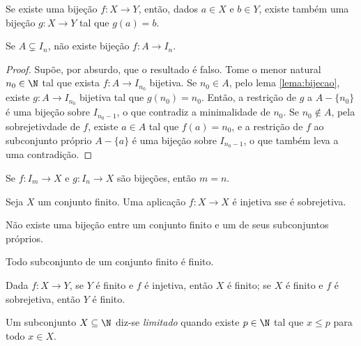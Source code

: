 \documentclass{article}
\begin{document}
\begin{lem} \label{lema:bijecao}
    Se existe uma bijeção \(f: X \to Y\), então, dados \(a \in X\) e \(b \in Y\), existe também uma bijeção \(g: X \to Y\) tal que \(g(a) = b\).
\end{lem}

\begin{thm}
    Se \(A \subsetneq I_n\), não existe bijeção \(f: A \to I_n\).
\end{thm}

\begin{proof}
    Supõe, por absurdo, que o resultado é falso. Tome o menor natural \(n_0 \in \N\) tal que exista \(f: A \to I_{n_0}\) bijetiva. Se \(n_0 \in A\), pelo lema \eqref{lema:bijecao}, existe \(g: A \to I_{n_0}\) bijetiva tal que \(g(n_0)=n_0\).
    Então, a restrição de \(g\) a \(A - \{n_0\}\) é uma bijeção sobre \(I_{n_0 -1}\), o que contradiz a minimalidade de \(n_0\). Se \(n_0 \notin A\), pela sobrejetivdade de \(f\), existe \(a \in A\) tal que \(f(a)=n_0\), e a restrição de \(f\) ao subconjunto próprio \(A - \{a\}\) é uma bijeção sobre \(I_{n_0 -1}\), o que também leva a uma contradição.
\end{proof}

\begin{cor}
    Se \(f: I_m \to X\) e \(g: I_n \to X\) são bijeções, então \(m = n\).
\end{cor}

\begin{cor}
    Seja \(X\) um conjunto finito. Uma aplicação \(f: X \to X\) é injetiva sse é sobrejetiva.
\end{cor}

\begin{cor}
    Não existe uma bijeção entre um conjunto finito e um de seus subconjuntos próprios.
\end{cor}

\begin{thm}
    Todo subconjunto de um conjunto finito é finito.
\end{thm}

\begin{cor}
    Dada \(f: X \to Y\), se \(Y\) é finito e \(f\) é injetiva, então \(X\) é finito; se \(X\) é finito e \(f\) é sobrejetiva, então \(Y\) é finito.
\end{cor}

\begin{defn}
    Um subconjunto \(X \subseteq \N\) diz-se \emph{limitado} quando existe \(p \in \N\) tal que \(x \leq p\) para todo \(x \in X\).
\end{defn}
\end{document}
